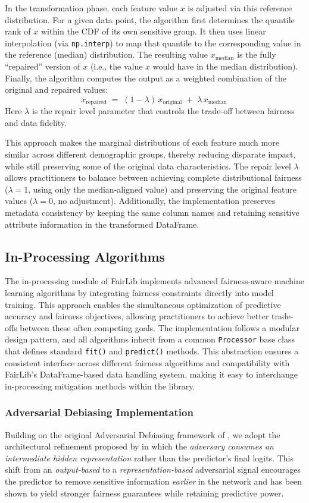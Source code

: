 \documentclass[12pt,a4paper,openright,twoside]{book}
\begin{document}
In the transformation phase, each feature value $x$ is adjusted via this reference distribution. For a given data point, the algorithm first determines the quantile rank of $x$ within the CDF of its own sensitive group. It then uses linear interpolation (via \texttt{np.interp}) to map that quantile to the corresponding value in the reference (median) distribution. The resulting value $x_{\text{median}}$ is the fully “repaired” version of $x$ (i.e., the value $x$ would have in the median distribution). Finally, the algorithm computes the output as a weighted combination of the original and repaired values: 
\[ 
x_{\text{repaired}} \;=\; (1 - \lambda)\,x_{\text{original}} \;+\; \lambda\,x_{\text{median}}\,
\] 
Here $\lambda$ is the repair level parameter that controls the trade-off between fairness and data fidelity.

This approach makes the marginal distributions of each feature much more similar across different demographic groups, thereby reducing disparate impact, while still preserving some of the original data characteristics. The repair level $\lambda$ allows practitioners to balance between achieving complete distributional fairness ($\lambda = 1$, using only the median-aligned value) and preserving the original feature values ($\lambda = 0$, no adjustment). Additionally, the implementation preserves metadata consistency by keeping the same column names and retaining sensitive attribute information in the transformed DataFrame.

\subsection{In-Processing Algorithms}
The in-processing module of FairLib implements advanced fairness-aware machine learning algorithms by integrating fairness constraints directly into model training. This approach enables the simultaneous optimization of predictive accuracy and fairness objectives, allowing practitioners to achieve better trade-offs between these often competing goals. The implementation follows a modular design pattern, and all algorithms inherit from a common \texttt{Processor} base class that defines standard \texttt{fit()} and \texttt{predict()} methods. This abstraction ensures a consistent interface across different fairness algorithms and compatibility with FairLib’s DataFrame-based data handling system, making it easy to interchange in-processing mitigation methods within the library.
\subsubsection{Adversarial Debiasing Implementation}
Building on the original Adversarial Debiasing framework of \cite{zhang2018mitigatingunwantedbiasesadversarial}, we adopt the architectural refinement proposed by \cite{beutel2017datadecisionstheoreticalimplications} in which the \emph{adversary consumes an intermediate hidden representation} rather than the predictor’s final logits.  This shift from an \textit{output-based} to a \textit{representation-based} adversarial signal encourages the predictor to remove sensitive information \emph{earlier} in the network and has been shown to yield stronger fairness guarantees while retaining predictive power.
\end{document}
